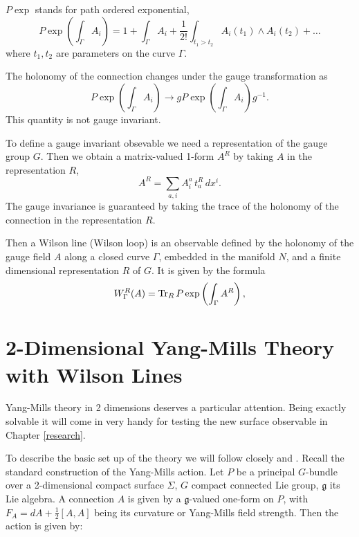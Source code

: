 \documentclass[11pt]{report}
\theoremstyle{plain}
\theoremstyle{definition}
\theoremstyle{remark}
\theoremstyle{remark}
\numberwithin{equation}{section}
\begin{document}
$P \exp$ stands for  path ordered exponential,
%
\begin{equation}
P\exp\left( \int_\Gamma A_i\right) = 1 + \int_\Gamma A_i + \frac{1}{2!} \int_{t_1 > t_2} A_i(t_1) \wedge A_i(t_2) + \dots
\end{equation}
where $t_1, t_2$ are parameters on the curve $\Gamma$.

The holonomy of the connection changes under the gauge transformation as 
\begin{equation}
P\exp\left(\int_\Gamma A_i\right) \to gP\exp\left(\int_\Gamma A_i\right)g^{-1}.
\end{equation}
This quantity is not gauge invariant. 

To define a gauge invariant obsevable we need a representation of the gauge group $G$. Then we obtain a matrix-valued 1-form $A^R$ by taking $A$ in the representation $R$,
%
\begin{equation}
A^R = \sum_{a,i} A^a_i \, t_a^R \, dx^i.
\end{equation}
The gauge invariance is guaranteed by taking the trace of the holonomy of the connection in the representation $R$. 



Then a Wilson line (Wilson loop) is an observable defined by the holonomy of the gauge field $A$ along a closed curve $\Gamma$, embedded in the manifold $N$, and a finite dimensional representation $R$ of $G$. It is given by the formula
%
\begin{equation}\label{WL}
W_\Gamma^R(A)= {\rm Tr}_R \, P\exp\left( \int_\Gamma A^R\right),
\end{equation}



\section{2-Dimensional Yang-Mills Theory with Wilson Lines}
Yang-Mills theory in 2 dimensions deserves a particular attention. Being exactly solvable it will come in very handy for testing the new surface observable in Chapter \ref{research}.

To describe the basic set up of the theory we will follow closely \cite{Moore} and \cite{Witten2}. Recall the standard construction of the Yang-Mills action. Let $P$ be a principal $G$-bundle over a 2-dimensional compact surface $\Sigma$, $G$ compact connected Lie group, $\mathfrak{g}$ its Lie algebra. A connection $A$ is given by a $\mathfrak{g}$-valued one-form on $P$, with $F_A = dA + \frac{1}{2} [A,A]$ being its curvature or Yang-Mills field strength. Then the action is given by:
\end{document}
